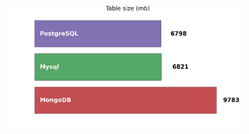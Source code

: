 \documentclass[usenames,dvipsnames, 18pt, compress, aspectratio=169]{beamer}
\begin{document}
\begin{frame}
    \frametitle{}
    \begin{center}
    \begin{figure}
        \includegraphics[width=0.95\textwidth,center]{benchmarks/table_size.png}
    \end{figure}
    \end{center}
\end{frame}



\end{document}
